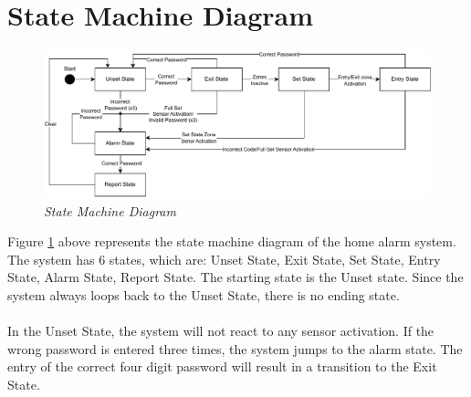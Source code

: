 \documentclass[aps, secnumarabic, balancelastpage, asmath, amssymb, nofootinbib, floatfix,]{revtex4-2}
\begin{document}
{\section{\fontsize{11.3pt}{12pt}\selectfont \bf State Machine Diagram}
\fontsize{11pt}{12pt}\selectfont
\label{sec:2}

\begin{figure}[h]
  \centering
  \includegraphics[scale = 0.85]{ce323-state-diagram.pdf}
  \caption{\em State Machine Diagram}
  \label{fig:image1}
\end{figure}

Figure \ref{fig:image1} above represents the state machine diagram of the home alarm system. The system has 6 states, which are: Unset State, Exit State, Set State, Entry State, Alarm State, Report State. The starting state is the Unset state. Since the system always loops back to the Unset State, there is no ending state. \\
\\
In the Unset State, the system will not react to any sensor activation. If the wrong password is entered three times, the system jumps to the alarm state. The entry of the correct four digit password will result in a transition to the Exit State. \\

}
\end{document}
